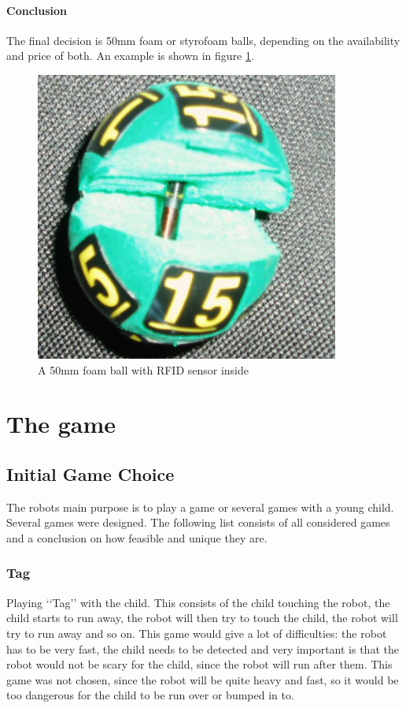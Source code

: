 \documentclass[11pt,twoside,a4paper]{report}
\begin{document}
\subsubsection{Conclusion}
The final decision is 50mm foam or styrofoam balls, depending on the availability and price of both. An example is shown in figure \ref{figure:lotteryball}.
\begin{figure}[H]
\begin{center}
\includegraphics[width=10cm]{Images/LOTTERY-BALLS-with-rfid.jpg}
\end{center}
\caption{A 50mm foam ball with RFID sensor inside}
\label{figure:lotteryball}
\end{figure}

\chapter{The game}
\label{chap:games}

\section{Initial Game Choice}
The robots main purpose is to play a game or several games with a young child. Several games were designed. The following list consists of all considered games and a conclusion on how feasible and unique they are.
\subsection{Tag}
Playing \lq\lq{}Tag\rq\rq{} with the child. This consists of the child touching the robot, the child starts to run away, the robot will then try to touch the child, the robot will try to run away and so on.
This game would give a lot of difficulties: the robot has to be very fast, the child needs to be detected and very important is that the robot would not be scary for the child, since the robot will run after them. This game was not chosen, since the robot will be quite heavy and fast, so it would be too dangerous for the child to be run over or bumped in to.
\end{document}
